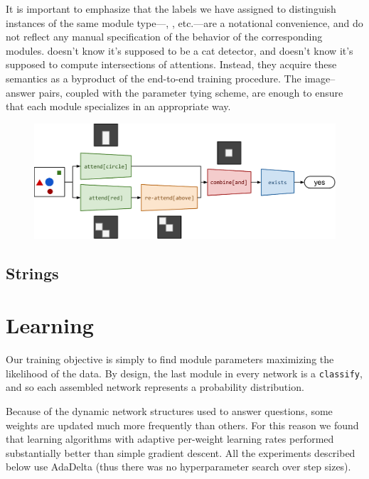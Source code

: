\documentclass[10pt,twocolumn,letterpaper]{article}
\begin{document}
It is important to emphasize that the labels we have assigned to distinguish instances of the same module type---, , etc.---are a notational convenience, and do not reflect any manual specification of the behavior of the corresponding modules.  doesn't know it's supposed to be a cat detector, and  doesn't know it's supposed to compute intersections of attentions. Instead, they acquire these semantics as a byproduct of the end-to-end training procedure. The image--answer pairs, coupled with the parameter tying scheme, are enough to ensure that each module specializes in an appropriate way.

\begin{figure}
    \includegraphics[width=\textwidth]{fig/full2}
\end{figure}

\subsection{Strings}

\section{Learning}

Our training objective is simply to find module parameters maximizing the likelihood of the data. By design, the last module in every network is a {\small\tt classify}, and so each assembled network represents a probability distribution.

Because of the dynamic network structures used to answer questions, some weights are updated much more frequently than others. For this reason we found that learning algorithms with adaptive per-weight learning rates performed substantially better than simple gradient descent. All the experiments described below use AdaDelta (thus there was no hyperparameter search over step sizes).

\end{document}
